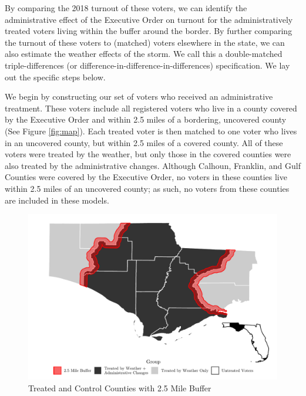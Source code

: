 \documentclass[
  12pt,
]{article}
\begin{document}
By comparing the 2018 turnout of these voters, we can identify the administrative effect of the Executive Order on turnout for the administratively treated voters living within the buffer around the border. By further comparing the turnout of these voters to (matched) voters elsewhere in the state, we can also estimate the weather effects of the storm. We call this a double-matched triple-differences (or difference-in-difference-in-differences) specification. We lay out the specific steps below.

We begin by constructing our set of voters who received an administrative treatment. These voters include all registered voters who live in a county covered by the Executive Order and within 2.5 miles of a bordering, uncovered county (See Figure \ref{fig:map}). Each treated voter is then matched to one voter who lives in an uncovered county, but within 2.5 miles of a covered county. All of these voters were treated by the weather, but only those in the covered counties were also treated by the administrative changes. Although Calhoun, Franklin, and Gulf Counties were covered by the Executive Order, no voters in these counties live within 2.5 miles of an uncovered county; as such, no voters from these counties are included in these models.

\begin{figure}[h]

{\centering \includegraphics{hurricane_michael_files/figure-latex/map-chunk-1} 

}

\caption{\label{fig:map}Treated and Control Counties with 2.5 Mile Buffer}\label{fig:map-chunk}
\end{figure}
\end{document}
